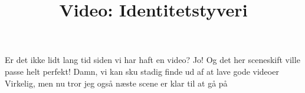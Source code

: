 \documentclass[a4paper,11pt]{article}
\title{Video: Identitetstyveri}
\begin{document}
\maketitle

\begin{sketch}
 Er det ikke lidt lang tid siden vi har haft en video?
 Jo! Og det her sceneskift ville passe helt perfekt!
 Damn, vi kan sku stadig finde ud af at lave gode videoer
 Virkelig, men nu tror jeg også næste scene er klar til at gå på
\end{sketch}
\end{document}
